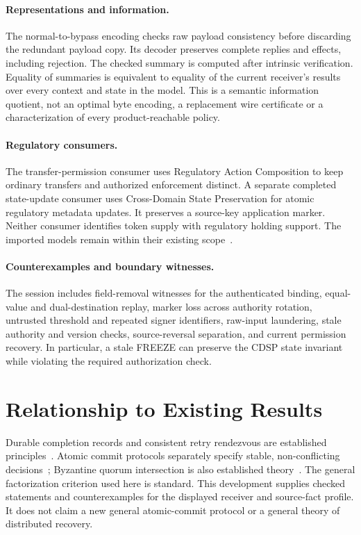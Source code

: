 \documentclass[11pt,a4paper]{article}
\begin{document}
\paragraph{Representations and information.}
The normal-to-bypass encoding checks raw payload consistency before discarding
the redundant payload copy. Its decoder preserves complete replies and effects,
including rejection. The checked summary is computed after intrinsic
verification. Equality of summaries is equivalent to equality of the current
receiver's results over every context and state in the model. This is a semantic
information quotient, not an optimal byte encoding, a replacement wire
certificate or a characterization of every product-reachable policy.

\paragraph{Regulatory consumers.}
The transfer-permission consumer uses Regulatory Action Composition to keep
ordinary transfers and authorized enforcement distinct. A separate completed
state-update consumer uses Cross-Domain State Preservation for atomic
regulatory metadata updates. It preserves a source-key application marker.
Neither consumer identifies token supply with regulatory holding support.
The imported models remain within their existing scope~\cite{cdsp}.

\paragraph{Counterexamples and boundary witnesses.}
The session includes field-removal witnesses for the authenticated binding,
equal-value and dual-destination replay, marker loss across authority rotation,
untrusted threshold and repeated signer identifiers, raw-input laundering,
stale authority and version checks, source-reversal separation, and current
permission recovery. In particular, a stale FREEZE can preserve the CDSP state
invariant while violating the required authorization check.

\section{Relationship to Existing Results}

Durable completion records and consistent retry rendezvous are established
principles~\cite{rifl}. Atomic commit protocols separately specify stable,
non-conflicting decisions~\cite{graylamport}; Byzantine quorum intersection is
also established theory~\cite{malkhireiter}. The general factorization criterion
used here is standard. This development supplies checked statements and
counterexamples for the displayed receiver and source-fact profile. It does
not claim a new general atomic-commit protocol or a general theory of
distributed recovery.
\end{document}
